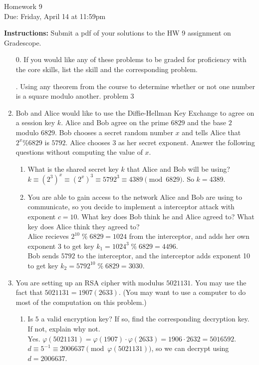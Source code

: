 \documentclass[12pt]{article}
\newcommand{\n}{\vspace{0.25cm}}
\begin{document}
\begin{center}
{\Large Homework 9}\\
Due: Friday,  April 14 at 11:59pm\\


\end{center}
{\bf Instructions:} Submit a pdf of your solutions to the HW 9 assignment on Gradescope.  



\begin{enumerate}
\item[0.] If you would like any of these problems to be graded for proficiency with the core skills, list the skill and the corresponding problem. 
  \begin{outline}
    . Using any theorem from the course to determine whether or not one number is a square modulo another.
      \2 problem 3
  \end{outline} \n

\item Bob and Alice would like to use the Diffie-Hellman Key Exchange to agree on a session key $k$. Alice and Bob agree on the prime $6829$ and the base $2$ modulo $6829$. Bob chooses a secret random number $x$ and tells Alice that $2^x\%6829$ is $5792$. Alice chooses $3$ as her secret exponent.  Answer the following questions without computing the value of $x$. 
\begin{enumerate}
\item What is the shared secret key $k$ that Alice and Bob will be using? \n\\
  \(k \equiv (2^3)^x \equiv (2^x)^3 \equiv 5792^3 \equiv 4389 \pmod{6829}\).  So \(k = 4389\).

\item You are able to gain access to the network Alice and Bob are using to communicate, so you decide to implement a interceptor attack with exponent $c=10$. What key does Bob think he and Alice agreed to? What key does Alice think they agreed to? \n\\
  Alice recieves \(2^{10} \;\%\; 6829 = 1024\) from the interceptor, and adds her own exponent 3 to get key \(k_1 = 1024^3 \;\%\; 6829 = 4496\). \\
  Bob sends \(5792\) to the interceptor, and the interceptor adds exponent 10 to get key \(k_2 = 5792^{10} \;\%\; 6829 = 3030\).
\end{enumerate}	 \n

\item You are setting up an RSA cipher with modulus $5021131$.  You may use the fact that $5021131 = 1907(2633)$.  (You may want to use a computer to do most of the computation on this problem.)
\begin{enumerate}
\item Is $5$ a valid encryption key?  If so, find the corresponding decryption key.  If not, explain why not. \n\\
  Yes.  \(\varphi(5021131) = \varphi(1907) \cdot \varphi(2633) = 1906 \cdot 2632 = 5016592\). \(d \equiv 5^{-1} \equiv 2006637 \pmod {\varphi(5021131)}\), so we can decrypt using \(d = 2006637\).


\end{enumerate}
\end{enumerate}
\end{document}
